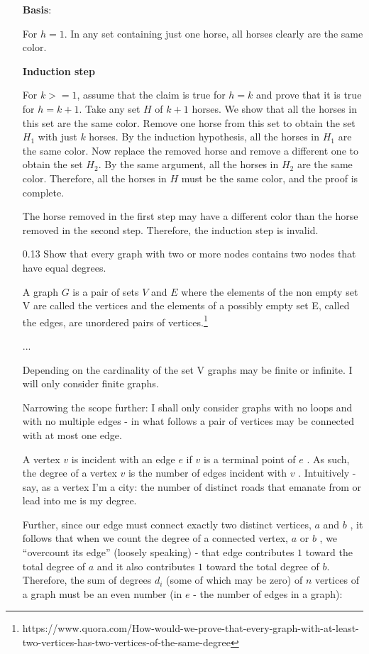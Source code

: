 \documentclass[12pt, a4paper]{article}
\begin{document}
\begin{enumerate}
\textbf{Basis}: 

For $h = 1$. In any set containing just one horse, all horses clearly are the same color.

\textbf{Induction step}

For $k >= 1$, assume that the claim is true for $h = k$ and prove that it is true for $h = k+1$. Take any set $H$ of $k+1$ horses. We show that all the horses in this set are the same color. Remove one horse from this set to obtain the set $H_1$ with just $k$ horses. By the induction hypothesis, all the horses in $H_1$ are the same color. Now replace the removed horse and remove a different one to obtain the set $H_2$. By the same argument, all the horses in $H_2$ are the same color. Therefore, all the horses in $H$ must be the same color, and the proof is complete.

The horse removed in the first step may have a different color than the horse removed in the second step. Therefore, the induction step is invalid.

\item[0.13]
Show that every graph with two or more nodes contains two nodes that have equal degrees.

A graph $G$ is a pair of sets $V$ and $E$ where the elements of the non empty set V are called the vertices and the elements of a possibly empty set E, called the edges, are unordered pairs of vertices.\footnote{https://www.quora.com/How-would-we-prove-that-every-graph-with-at-least-two-vertices-has-two-vertices-of-the-same-degree}

...

Depending on the cardinality of the set V graphs may be finite or infinite. I will only consider finite graphs.

Narrowing the scope further: I shall only consider graphs with no loops and with no multiple edges - in what follows a pair of vertices may be connected with at most one edge.

A vertex 
$v$
 is incident with an edge 
$e$
 if 
$v$
 is a terminal point of 
$e$
. As such, the degree of a vertex 
$v$
 is the number of edges incident with 
$v$
. Intuitively - say, as a vertex I’m a city: the number of distinct roads that emanate from or lead into me is my degree.

Further, since our edge must connect exactly two distinct vertices, 
$a$
 and 
$b$
, it follows that when we count the degree of a connected vertex, 
$a$
 or 
$b$
, we “overcount its edge” (loosely speaking) - that edge contributes 
$1$
 toward the total degree of $a$ and it also contributes $1$ toward the total degree of $b$.
Therefore, the sum of degrees $d_{i}$ (some of which may be zero) of $n$ vertices of a graph must be an even number (in $e$ - the number of edges in a graph):


\end{enumerate}
\end{document}
